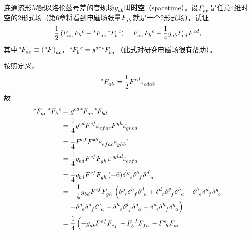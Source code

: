 \begin{xiti}
	\item 连通流形$M$配以洛伦兹号差的度规场$\tensor{g}{_a_b} $叫\textbf{时空}（spacetime）。设$\tensor{F}{_a_b} $是任意4维时空的2形式场（第6章将看到电磁场张量$\tensor{F}{_a_b} $就是一个2形式场），试证
	\[ \frac{1}{2} \left( \tensor{F}{_a_c}\tensor{F}{_b^c} + \tensor[^*]{F}{_a_c} \tensor[^*]{F}{_b^c} \right) = \tensor{F}{_a_c} \tensor{F}{_b^c} - \frac{1}{4} \tensor{g}{_a_b} \tensor{F}{_c_d} \tensor{F}{^c^d}, \]
	其中$\tensor[^*]{F}{_a_c} \equiv \tensor{\left(\tensor[^*]{F}{}\right)}{_a_c} $，$\tensor[^*]{F}{_b^c}= \tensor{g}{^a^c} \tensor[^*]{F}{_b_a} $（此式对研究电磁场很有帮助）。

	\begin{zm}
		按照定义，
		\begin{displaymath}
		\tensor[^*]{F}{_a_b} = \frac{1}{2} \tensor{F}{^c^d} \tensor{\varepsilon}{_c_d_a_b}
		\end{displaymath}
		故
		\begin{align*}
		\tensor[^*]{F}{_a_c} \tensor[^*]{F}{_b^c} =& \; \tensor{g}{^c^d} \tensor[^*]{F}{_a_c} \tensor[^*]{F}{_b_d} \\
		=& \mspace{5mu} \frac{1}{4} \tensor{g}{^c^d} \tensor{F}{^e^f} \tensor{\varepsilon}{_e_f_a_c} \tensor{F}{^g^h} \tensor{\varepsilon}{_g_h_b_d}\\
		=& \mspace{5mu} \frac{1}{4} \tensor{F}{^e^f} \tensor{F}{^g^h} \tensor{\varepsilon}{_e_f_a_c}  \tensor{\varepsilon}{_g_h_b^c}\\
		=& \mspace{5mu} \frac{1}{4} \tensor{g}{_b_d} \tensor{F}{^e^f} \tensor{F}{_g_h} \tensor{\varepsilon}{^c^g^h^d} \tensor{\varepsilon}{_c_e_f_a}\\
		=& \mspace{5mu} \frac{1}{4} \tensor{g}{_b_d} \tensor{F}{^e^f} \tensor{F}{_g_h} (-6) \tensor{\delta}{^{[g}_e} \tensor{\delta}{^h_f} \tensor{\delta}{^{d]}_a}\\
		=& \mspace{1mu} - \mspace{-4mu} \frac{1}{4} \tensor{g}{_b_d} \tensor{F}{^e^f} \tensor{F}{_g_h} \left( \tensor{\delta}{^g_e} \tensor{\delta}{^h_f} \tensor{\delta}{^d_a} + \tensor{\delta}{^d_e} \tensor{\delta}{^g_f} \tensor{\delta}{^h_a} + \tensor{\delta}{^h_e} \tensor{\delta}{^d_f} \tensor{\delta}{^g_a}\right.\\
		& \left.- \tensor{\delta}{^g_e} \tensor{\delta}{^d_f} \tensor{\delta}{^h_a} - \tensor{\delta}{^h_e} \tensor{\delta}{^g_f} \tensor{\delta}{^d_a} - \tensor{\delta}{^d_e} \tensor{\delta}{^h_f} \tensor{\delta}{^g_a} \right)\\
		=& \mspace{5mu} \frac{1}{4} \left( - \tensor{g}{_a_b} \tensor{F}{^e^f} \tensor{F}{_e_f} - \tensor{F}{_b^f} \tensor{F}{_f_a} - \tensor{F}{^e_b} \tensor{F}{_a_e} \right. \\

\end{align*}
\end{zm}
\end{xiti}
